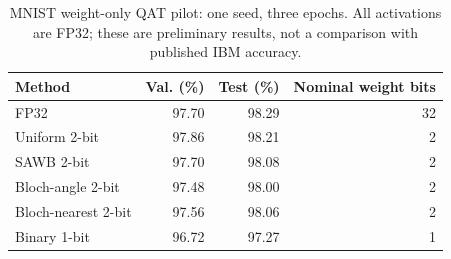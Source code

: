 \begin{table}[t]
\centering
\caption{MNIST weight-only QAT pilot: one seed, three epochs. All activations are FP32; these are preliminary results, not a comparison with published IBM accuracy.}
\label{tab:mnist-pilot}
\begin{tabular}{lrrr}
\hline
Method & Val. (\%) & Test (\%) & Nominal weight bits \\
\hline
FP32 & 97.70 & 98.29 & 32 \\
Uniform 2-bit & 97.86 & 98.21 & 2 \\
SAWB 2-bit & 97.70 & 98.08 & 2 \\
Bloch-angle 2-bit & 97.48 & 98.00 & 2 \\
Bloch-nearest 2-bit & 97.56 & 98.06 & 2 \\
Binary 1-bit & 96.72 & 97.27 & 1 \\
\hline
\end{tabular}
\end{table}
